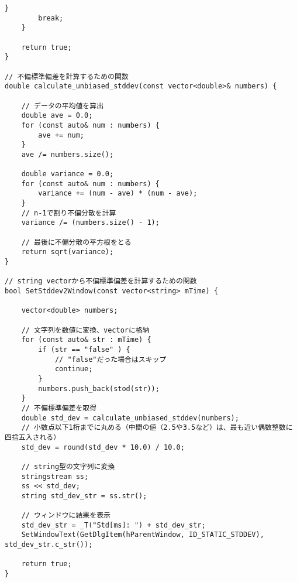 \begin{lstlisting}[caption=main.cpp]
		}
		break;
	}

	return true;
}

// 不偏標準偏差を計算するための関数
double calculate_unbiased_stddev(const vector<double>& numbers) {

	// データの平均値を算出
	double ave = 0.0;
	for (const auto& num : numbers) {
		ave += num;
	}
	ave /= numbers.size();

	double variance = 0.0;
	for (const auto& num : numbers) {
		variance += (num - ave) * (num - ave);
	}
	// n-1で割り不偏分散を計算
	variance /= (numbers.size() - 1);
	
	// 最後に不偏分散の平方根をとる
	return sqrt(variance);
}

// string vectorから不偏標準偏差を計算するための関数
bool SetStddev2Window(const vector<string> mTime) {

	vector<double> numbers;

	// 文字列を数値に変換、vectorに格納
	for (const auto& str : mTime) {
		if (str == "false" ) {
			// "false"だった場合はスキップ
			continue;
		}
		numbers.push_back(stod(str));
	}
	// 不偏標準偏差を取得
	double std_dev = calculate_unbiased_stddev(numbers);
	// 小数点以下1桁までに丸める（中間の値（2.5や3.5など）は、最も近い偶数整数に四捨五入される）
	std_dev = round(std_dev * 10.0) / 10.0;

	// string型の文字列に変換
	stringstream ss;
	ss << std_dev;
	string std_dev_str = ss.str();

	// ウィンドウに結果を表示
	std_dev_str = _T("Std[ms]: ") + std_dev_str;
	SetWindowText(GetDlgItem(hParentWindow, ID_STATIC_STDDEV), std_dev_str.c_str());

	return true;
}
\end{lstlisting}
	